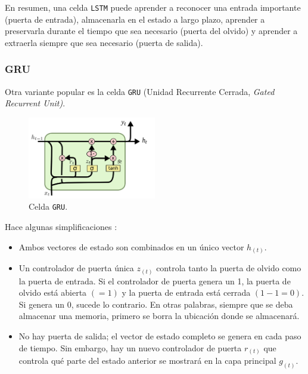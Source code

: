 \documentclass[a4paper,12pt]{article}
\begin{document}
En resumen, una celda \texttt{LSTM} puede aprender a reconocer una entrada importante (puerta de entrada), almacenarla en el estado a largo plazo, aprender a preservarla durante el tiempo que sea necesario (puerta del olvido) y aprender a extraerla siempre que sea necesario (puerta de salida).

\subsubsection{GRU}

Otra variante popular es la celda \texttt{GRU} (Unidad Recurrente Cerrada, \textit{Gated Recurrent Unit)}. \citep{olahlstm}

\begin{figure}[H]
	\begin{center}				
	\includegraphics[width=0.5\textwidth]{gru2.png}
  	\caption{Celda \texttt{GRU}.}
  	\label{fig:lstm5}
  	\end{center}
\end{figure}

Hace algunas simplificaciones \citep{geron}:

\begin{itemize}[noitemsep, topsep=2pt]
	\item Ambos vectores de estado son combinados en un único vector $h_{(t)}$.
	\item Un controlador de puerta única $z_{(t)}$ controla tanto la puerta de olvido como la puerta de entrada. Si el controlador de puerta genera un 1, la puerta de olvido está abierta $(=1)$ y la puerta de entrada está cerrada $(1-1=0)$. Si genera un 0, sucede lo contrario. En otras palabras, siempre que se deba almacenar una memoria, primero se borra la ubicación donde se almacenará.
	\item No hay puerta de salida; el vector de estado completo se genera en cada paso de tiempo. Sin embargo, hay un nuevo controlador de puerta $r_{(t)}$ que controla qué parte del estado anterior se mostrará en la capa principal $g_{(t)}$.

\end{itemize}
\end{document}
